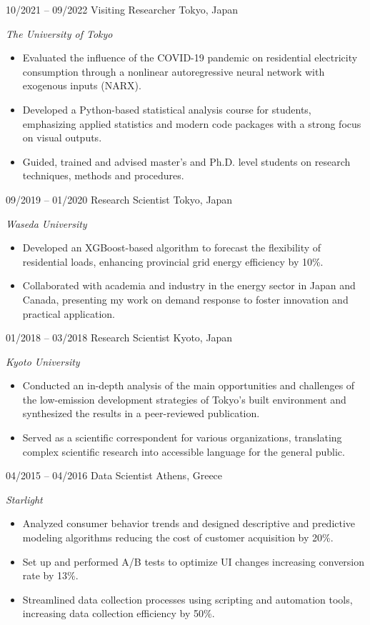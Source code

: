 \begin{entrylist}
\entry
{10/2021 -- 09/2022}
{Visiting Researcher}
{Tokyo, Japan}
{\emph{The University of Tokyo}
\begin{itemize}
	\item Evaluated the influence of the COVID-19 pandemic on residential electricity consumption through a nonlinear autoregressive neural network with exogenous inputs (NARX).
 	\item Developed a Python-based statistical analysis course for students, emphasizing applied statistics and modern code packages with a strong focus on visual outputs.
	\item Guided, trained and advised master's and Ph.D. level students on research techniques, methods and procedures.
\end{itemize}
}

\entry
{09/2019 -- 01/2020}
{Research Scientist}
{Tokyo, Japan}
{\emph{Waseda University}
\begin{itemize}
\item Developed an XGBoost-based algorithm to forecast the flexibility of residential loads, enhancing provincial grid energy efficiency by 10\%.
\item Collaborated with academia and industry in the energy sector in Japan and Canada, presenting my work on demand response to foster innovation and practical application.
\end{itemize}
}
\end{entrylist}
\begin{entrylist}
\entry
{01/2018 -- 03/2018}
{Research Scientist}
{Kyoto, Japan}
{\emph{Kyoto University}
\begin{itemize}
\item Conducted an in-depth analysis of the main opportunities and challenges of the low-emission development strategies of Tokyo’s built environment and synthesized the results in a peer-reviewed publication.
\item Served as a scientific correspondent for various organizations, translating complex scientific research into accessible language for the general public.
\end{itemize}
}
\end{entrylist}
\begin{entrylist}
\entry
{04/2015 -- 04/2016}
{Data Scientist}
{Athens, Greece}
{\emph{Starlight}
\begin{itemize}
\item	Analyzed consumer behavior trends and designed descriptive and predictive modeling algorithms reducing the cost of customer acquisition by 20\%.
\item	Set up and performed A/B tests to optimize UI changes increasing conversion rate by 13\%.
\item	Streamlined data collection processes using scripting and automation tools, increasing data collection efficiency by 50\%.
\end{itemize}}
\end{entrylist}
